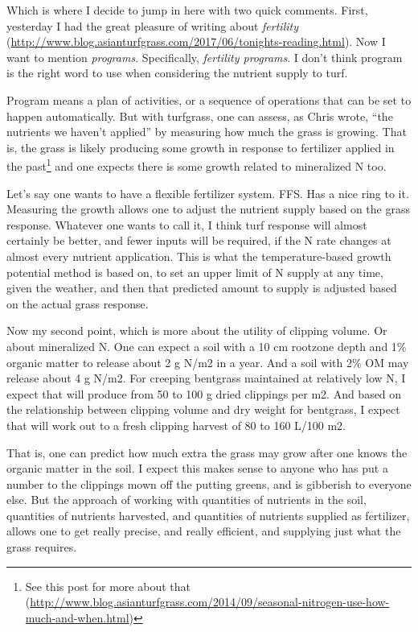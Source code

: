 \documentclass[12pt,b5,]{tufte-book}
\begin{document}
Which is where I decide to jump in here with two quick comments. First, yesterday I had the great pleasure of writing about \emph{fertility} (\url{http://www.blog.asianturfgrass.com/2017/06/tonights-reading.html}). Now I want to mention \emph{programs}. Specifically, \emph{fertility programs}. I don't think program is the right word to use when considering the nutrient supply to turf.

Program means a plan of activities, or a sequence of operations that can be set to happen automatically. But with turfgrass, one can assess, as Chris wrote, ``the nutrients we haven't applied'' by measuring how much the grass is growing. That is, the grass is likely producing some growth in response to fertilizer applied in the past\footnote{See this post for more about that (\url{http://www.blog.asianturfgrass.com/2014/09/seasonal-nitrogen-use-how-much-and-when.html})} and one expects there is some growth related to mineralized N too.

Let's say one wants to have a flexible fertilizer system. FFS. Has a nice ring to it. Measuring the growth allows one to adjust the nutrient supply based on the grass response. Whatever one wants to call it, I think turf response will almost certainly be better, and fewer inputs will be required, if the N rate changes at almost every nutrient application. This is what the temperature-based growth potential method is based on, to set an upper limit of N supply at any time, given the weather, and then that predicted amount to supply is adjusted based on the actual grass response.

Now my second point, which is more about the utility of clipping volume. Or about mineralized N. One can expect a soil with a 10 cm rootzone depth and 1\% organic matter to release about 2 g N/m2 in a year. And a soil with 2\% OM may release about 4 g N/m2. For creeping bentgrass maintained at relatively low N, I expect that will produce from 50 to 100 g dried clippings per m2. And based on the relationship between clipping volume and dry weight for bentgrass, I expect that will work out to a fresh clipping harvest of 80 to 160 L/100 m2.

That is, one can predict how much extra the grass may grow after one knows the organic matter in the soil. I expect this makes sense to anyone who has put a number to the clippings mown off the putting greens, and is gibberish to everyone else. But the approach of working with quantities of nutrients in the soil, quantities of nutrients harvested, and quantities of nutrients supplied as fertilizer, allows one to get really precise, and really efficient, and supplying just what the grass requires.
\end{document}
